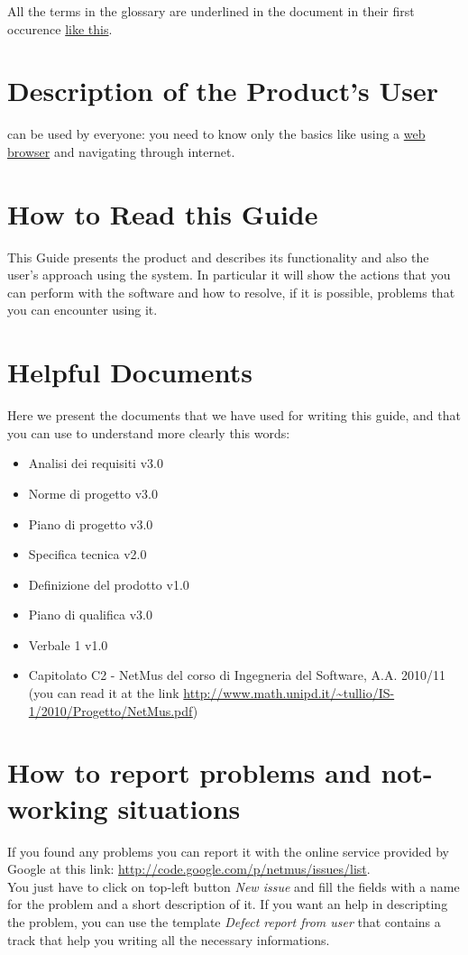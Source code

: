 All the terms in the glossary are underlined in the document in their first
occurence \underline{like this}.

\section{Description of the Product's User}
 can be used by everyone: you need to know only the basics like using
a \underline{web browser} and navigating through internet. 


\section{How to Read this Guide}
This Guide presents the product  and describes its functionality and
also the user's approach using the system. In particular it will show the 
actions that you can perform with the software and how to resolve, if it is
possible, problems that you can encounter using it.

\section{Helpful Documents}
Here we present the documents that we have used for writing this guide, and that
you can use to understand more clearly this words:
\begin{itemize}
  \item Analisi dei requisiti v3.0
  \item Norme di progetto v3.0
  \item Piano di progetto v3.0
  \item Specifica tecnica v2.0
  \item Definizione del prodotto v1.0
  \item Piano di qualifica v3.0
  \item Verbale 1 v1.0
  \item Capitolato C2 - NetMus del corso di Ingegneria del Software, A.A.
2010/11 (you can read it at the link 
\url{http://www.math.unipd.it/~tullio/IS-1/2010/Progetto/NetMus.pdf})
\end{itemize}

\section{How to report problems and not-working situations}
If you found any problems you can report it with the online service provided by
Google at this link:  \url{http://code.google.com/p/netmus/issues/list}.\\
You just have to click on top-left button \emph{New issue} and fill the
fields with a name for the problem and a short description of it.
If you want an help in descripting the problem, you can use the template
\emph{Defect report from user} that contains a track that help you writing all
the necessary informations. 


